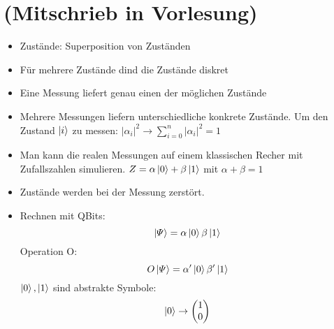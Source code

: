 \chapter{(Mitschrieb in Vorlesung)}
\begin{itemize}
\item Zustände: Superposition von Zuständen
\item Für mehrere Zustände dind die Zustände diskret
\item Eine Messung liefert genau einen der möglichen Zustände
\item Mehrere Messungen liefern unterschiedliche konkrete Zustände. Um den Zustand $\ket{i}$ zu messen: $\left\lvert \alpha_i \right\rvert ^2 \rightarrow \sum_{i = 0}^{n} \left\lvert \alpha_i \right\rvert ^2 = 1$
\item Man kann die realen Messungen auf einem klassischen Recher mit Zufallszahlen simulieren.
$Z=\alpha\ket{0}+\beta\ket{1}$ mit $\alpha + \beta = 1$
\item Zustände werden bei der Messung zerstört.
\item Rechnen mit QBits: \\
$$
\ket{\varPsi} = \alpha\ket{0}\beta\ket{1}
$$
Operation O:
$$
O \ket{\varPsi} = \alpha'\ket{0}\beta'\ket{1}
$$
$\ket{0},\ket{1}$ sind abstrakte Symbole:
$$
\ket{0}\rightarrow \begin{pmatrix}
    1 \\ 0
\end{pmatrix}
$$
\end{itemize}
